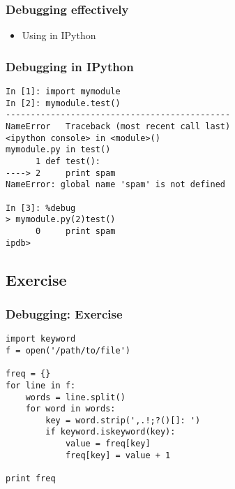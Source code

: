 \documentclass[compress,14pt]{beamer}
\newcounter{time}
\newcommand{\inctime}[1]{\addtocounter{time}{#1}{\vspace*{0.1in}\tiny \thetime\ m}}
\begin{document}
\begin{frame}[fragile]
    \frametitle{Debugging effectively}
    \begin{itemize}
      \item Using  in IPython
    \end{itemize}
\end{frame}

\begin{frame}[fragile]
\frametitle{Debugging in IPython}
\small
\begin{lstlisting}
In [1]: import mymodule
In [2]: mymodule.test()
---------------------------------------------
NameError   Traceback (most recent call last)
<ipython console> in <module>()
mymodule.py in test()
      1 def test():
----> 2     print spam
NameError: global name 'spam' is not defined

In [3]: %debug
> mymodule.py(2)test()
      0     print spam
ipdb> 
\end{lstlisting}
\inctime{15} 
\end{frame}

\subsection{Exercise}
\begin{frame}[fragile]
\frametitle{Debugging: Exercise}
\small
\begin{lstlisting}
import keyword
f = open('/path/to/file')

freq = {}
for line in f:
    words = line.split()
    for word in words:
        key = word.strip(',.!;?()[]: ')
        if keyword.iskeyword(key):
            value = freq[key]
            freq[key] = value + 1

print freq
\end{lstlisting}
\inctime{10}
\end{frame}

   


\end{document}
